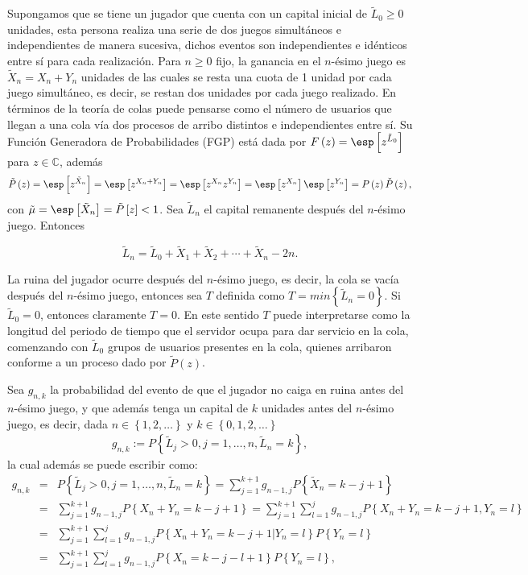 Supongamos que se tiene un jugador que cuenta con un capital inicial de $\tilde{L}_{0}\geq0$ unidades, esta persona realiza una serie de dos juegos simult\'aneos e independientes de manera sucesiva, dichos eventos son independientes e id\'enticos entre s\'i para cada realizaci\'on. Para $n\geq0$ fijo, la ganancia en el $n$-\'esimo juego es $\tilde{X}_{n}=X_{n}+Y_{n}$ unidades de las cuales se resta una cuota de 1 unidad por cada juego simult\'aneo, es decir, se restan dos unidades por cada juego realizado. En t\'erminos de la teor\'ia de colas puede pensarse como el n\'umero de usuarios que llegan a una cola v\'ia dos procesos de arribo distintos e independientes entre s\'i. Su Funci\'on Generadora de Probabilidades (FGP) est\'a dada por $F\left(z\right)=\esp\left[z^{\tilde{L}_{0}}\right]$ para $z\in\mathbb{C}$, adem\'as
$$\tilde{P}\left(z\right)=\esp\left[z^{\tilde{X}_{n}}\right]=\esp\left[z^{X_{n}+Y_{n}}\right]=\esp\left[z^{X_{n}}z^{Y_{n}}\right]=\esp\left[z^{X_{n}}\right]\esp\left[z^{Y_{n}}\right]=P\left(z\right)\check{P}\left(z\right),$$ con $\tilde{\mu}=\esp\left[\tilde{X}_{n}\right]=\tilde{P}\left[z\right]<1$. Sea $\tilde{L}_{n}$ el capital remanente despu\'es del $n$-\'esimo
juego. Entonces

$$\tilde{L}_{n}=\tilde{L}_{0}+\tilde{X}_{1}+\tilde{X}_{2}+\cdots+\tilde{X}_{n}-2n.$$

La ruina del jugador ocurre despu\'es del $n$-\'esimo juego, es decir, la cola se vac\'ia despu\'es del $n$-\'esimo juego, entonces sea $T$ definida como $T=min\left\{\tilde{L}_{n}=0\right\}$. Si $\tilde{L}_{0}=0$, entonces claramente $T=0$. En este sentido $T$ puede interpretarse como la longitud del periodo de tiempo que el servidor ocupa para dar servicio en la cola, comenzando con $\tilde{L}_{0}$ grupos de usuarios presentes en la cola, quienes arribaron conforme a un proceso dado por $\tilde{P}\left(z\right)$.

Sea $g_{n,k}$ la probabilidad del evento de que el jugador no caiga en ruina antes del $n$-\'esimo juego, y que adem\'as tenga un capital de $k$ unidades antes del $n$-\'esimo juego, es decir, dada $n\in\left\{1,2,\ldots\right\}$ y $k\in\left\{0,1,2,\ldots\right\}$
\begin{eqnarray*}
g_{n,k}:=P\left\{\tilde{L}_{j}>0, j=1,\ldots,n,
\tilde{L}_{n}=k\right\},
\end{eqnarray*}
la cual adem\'as se puede escribir como:
\begin{eqnarray*}
g_{n,k}&=&P\left\{\tilde{L}_{j}>0, j=1,\ldots,n,
\tilde{L}_{n}=k\right\}=\sum_{j=1}^{k+1}g_{n-1,j}P\left\{\tilde{X}_{n}=k-j+1\right\}\\
&=&\sum_{j=1}^{k+1}g_{n-1,j}P\left\{X_{n}+Y_{n}=k-j+1\right\}=\sum_{j=1}^{k+1}\sum_{l=1}^{j}g_{n-1,j}P\left\{X_{n}+Y_{n}=k-j+1,Y_{n}=l\right\}\\
&=&\sum_{j=1}^{k+1}\sum_{l=1}^{j}g_{n-1,j}P\left\{X_{n}+Y_{n}=k-j+1|Y_{n}=l\right\}P\left\{Y_{n}=l\right\}\\
&=&\sum_{j=1}^{k+1}\sum_{l=1}^{j}g_{n-1,j}P\left\{X_{n}=k-j-l+1\right\}P\left\{Y_{n}=l\right\},
\end{eqnarray*}


